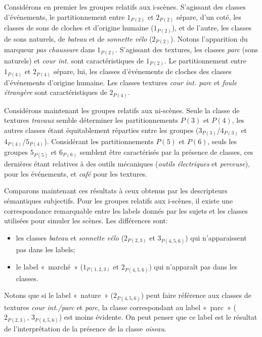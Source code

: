 Considérons en premier les groupes relatifs aux i-scènes. S'agissant des classes d'événements, le partitionnement entre $1_{P(2)}$ et $2_{P(2)}$ sépare, d'un coté, les classes de sons de cloches et d'origine humaine ($1_{P(2)}$), et de l'autre, les classes de sons naturels, de \emph{bateau} et de \emph{sonnette vélo} ($2_{P(2)}$). Notons l'apparition du marqueur \emph{pas chaussure} dans $1_{P(2)}$. S'agissant des textures, les classes \emph{parc} (sons naturels) et \emph{cour int.} sont caractéristiques de $1_{P(2)}$. Le partitionnement entre $1_{P(4)}$ et $2_{P(4)}$ sépare, lui, les classes d'événements de cloches des classes d'événements d'origine humaine. Les classes textures \emph{cour int. parc} et \emph{foule étrangère} sont caractéristiques de $2_{P(4)}$.

Considérons maintenant les groupes relatifs aux ni-scènes. Seule la classe de textures \emph{travaux} semble déterminer les partitionnements $P(3)$ et $P(4)$, les autres classes étant équitablement réparties entre les groupes ($3_{P(3)}$/$4_{P(3)}$ et $4_{P(4)}$/$5_{P(4)}$). Considérant les partitionnements $P(5)$ et $P(6)$, seuls les groupes $5_{P(5)}$ et $6_{P(6)}$ semblent être caractérisés par la présence de classes, ces dernières étant relatives à des outils mécaniques (\emph{outils électriques} et \emph{perceuse}), pour les événements, et \emph{café} pour les textures.

Comparons maintenant ces résultats à ceux obtenus par les descripteurs sémantiques subjectifs. Pour les groupes relatifs aux i-scènes, il existe une correspondance remarquable entre les labels donnés par les sujets et les classes utilisées pour simuler les scènes. Les différences sont:

\begin{itemize}
\item les classes \emph{bateau} et \emph{sonnette vélo} ($2_{P(2,3)}$ et $3_{P(4,5,6)}$) qui n’apparaissent pas dans les labels;
\item le label «~marché~» ($1_{P(1,2,3)}$ et $2_{P(4,5,6)}$) qui n'apparaît pas dans les classes.
\end{itemize} 

Notons que si le label «~nature~» ($2_{P(4,5,6)}$) peut faire référence aux classes de textures \emph{cour int./parc} et \emph{parc}, la classe correspondant au label «~parc~» ($2_{P(2,3)}$, $3_{P(4,5,6)}$) est moins évidente. On peut penser que ce label est le résultat de l'interprétation de la présence de la classe \emph{oiseau}.

